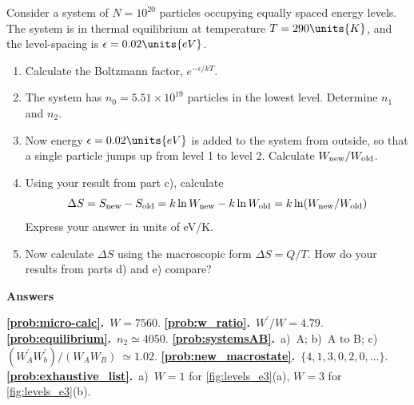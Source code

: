 \begin{problem}
  Consider a system of $N = 10^{20}$ particles occupying equally spaced
  energy levels.  The system is in thermal equilibrium at temperature
  $T = 290\units{K}$, and the level-spacing is $\epsilon =
  0.02\units{eV}$.
  \begin{enumerate}
  \item Calculate the Boltzmann factor, $e^{-\epsilon/kT}$.
  \item The system has $n_0 = 5.51 \times 10^{19}$ particles in the
    lowest level.  Determine $n_1$ and $n_2$.
  \item Now energy $\epsilon = 0.02\units{eV}$ is added to the system
    from outside, so that a single particle jumps up from level 1 to
    level 2.  Calculate $W_{\rm new}/W_{\rm old}$.
  \item Using your result from part c), calculate
    \[ \Delta S = S_{\rm new} - S_{\rm old} = k \ln W_{\rm new} - k
    \ln W_{\rm old} = k \ln (W_{\rm new}/W_{\rm old}) \] Express your
    answer in units of eV/K.
  \item Now calculate $\Delta S$ using the macroscopic form $\Delta S
    = Q/T$.  How do your results from parts d) and e) compare?
  \end{enumerate}
\end{problem}

\vspace{3in}
\noindent\textbf{Answers}
\vspace{3mm}

\noindent
{\bf \ref{prob:micro-calc}.}~$W = 7560$. 
{\bf \ref{prob:w_ratio}.}~$W^\prime/W = 4.79$.
{\bf \ref{prob:equilibrium}.}~$n_2 \simeq 4050$.
{\bf \ref{prob:systemsAB}.}~a)~A; b)~A to B; 
c)~$(W_A^\prime W_b^\prime)/(W_AW_B)~\simeq 1.02$.
{\bf \ref{prob:new_macrostate}.}~$\{ 4,1,3,0,2,0,\dots\}$.
{\bf \ref{prob:exhaustive_list}.}~a)~$W = 1$ for 
\ref{fig:levels_e3}(a), $W=3$ for \ref{fig:levels_e3}(b).
